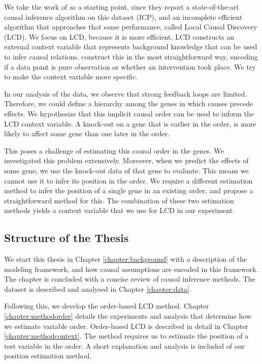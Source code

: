 We take the work of \citet{versteeg2019boosting} as a starting point, since they report a state-of-the-art causal inference algorithm on this dataset (ICP), and an incomplete efficient algorithm that approaches that same performance, called Local Causal Discovery (LCD). We focus on LCD, because it is more efficient. LCD constructs an external context variable that represents background knowledge that can be used to infer causal relations. \citet{versteeg2019boosting} construct this in the most straightforward way, encoding if a data point is pure observation or whether an intervention took place. We try to make the context variable more specific.

In our analysis of the data, we observe that strong feedback loops are limited. Therefore, we could define a hierarchy among the genes in which causes precede effects. We hypothesize that this implicit causal order can be used to inform the LCD context variable. A knock-out on a gene that is earlier in the order, is more likely to affect some gene than one later in the order. 

This poses a challenge of estimating this causal order in the genes. We investigated this problem extensively. Moreover, when we predict the effects of some gene, we use the knock-out data of that gene to evaluate. This means we cannot use it to infer its position in the order. We require a different estimation method to infer the position of a single gene in an existing order, and propose a straightforward method for this. The combination of these two estimation methods yields a context variable that we use for LCD in our experiment.


\subsection{Structure of the Thesis}
We start this thesis in Chapter \ref{chapter:background} with a description of the modeling framework, and how causal assumptions are encoded in this framework. The chapter is concluded with a concise review of causal inference methods. The dataset is described and analysed in Chapter \ref{chapter:data}.

Following this, we develop the order-based LCD method. Chapter \ref{chapter:methodorder} details the experiments and analysis that determine how we estimate variable order. Order-based LCD is described in detail in Chapter \ref{chapter:methodcontext}. The method requires us to estimate the position of a test variable in the order. A short explanation and analysis is included of our position estimation method. 

